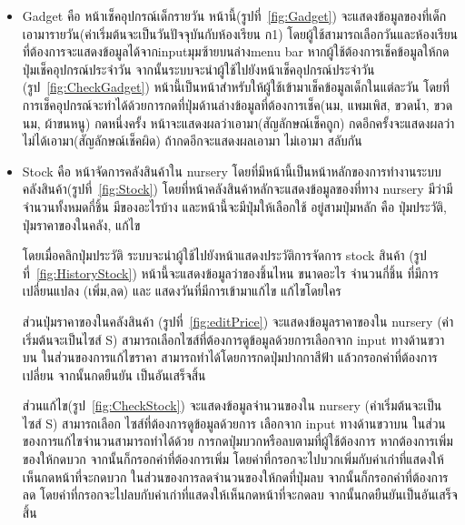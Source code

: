 \begin{itemize}
  \item  Gadget คือ หน้าเช็คอุปกรณ์เด็กรายวัน หน้านี้(รูปที่~\ref{fig:Gadget}) จะแสดงข้อมูลของที่เด็กเอามารายวัน(ค่าเริ่มต้นจะเป็นวันปัจจุบันกับห้องเรียน ก1) โดยผู้ใช้สามารถเลือกวันและห้องเรียนที่ต้องการจะแสดงข้อมูลได้จากinputมุมซ้ายบนล่างmenu bar 
  หากผู้ใช้ต้องการเช็คข้อมูลให้กดปุ่มเช็คอุปกรณ์ประจำวัน จากนั้นระบบจะนำผู้ใช้ไปยังหน้าเช็คอุปกรณ์ประจำวัน (รูป~\ref{fig:CheckGadget}) 
  หน้านี้เป็นหน้าสำหรับให้ผู้ใช้เข้ามาเช็คข้อมูลเด็กในแต่ละวัน โดยที่การเช็คอุปกรณ์จะทำได้ด้วยการกดที่ปุ่มด้านล่างข้อมูลที่ต้องการเช็ค(นม, แพมเพิส, ขวดน้ำ, ขวดนม, ผ้าขนหนู) กดหนึ่งครั้ง
  หน้าจะแสดงผลว่าเอามา(สัญลักษณ์เช็คถูก) กดอีกครั้งจะแสดงผลว่าไม่ได้เอามา(สัญลักษณ์เช็คผิด) ถ้ากดอีกจะแสดงผลเอามา ไม่เอามา สลับกัน
  
  \item  Stock คือ หน้าจัดการคลังสินค้าใน nursery โดยที่มีหน้านี้เป็นหน้าหลักของการทำงานระบบคลังสินค้า(รูปที่~\ref{fig:Stock}) โดยที่หน้าคลังสินค้าหลักจะแสดงข้อมูลของที่ทาง nursery มีว่ามีจำนวนทั้งหมดกี่ชิ้น มีของอะไรบ้าง และหน้านี้จะมีปุ่มให้เลือกใช้
  อยู่สามปุ่มหลัก คือ ปุ่มประวัติ, ปุ่มราคาของในคลัง, แก้ไข 
  
  โดยเมื่อคลิกปุ่มประวัติ ระบบจะนำผู้ใช้ไปยังหน้าแสดงประวัติการจัดการ stock สินค้า (รูปที่~\ref{fig:HistoryStock}) หน้านี้จะแสดงข้อมูลว่าของชิ้นไหน ขนาดอะไร จำนวนกี่ชิ้น ที่มีการเปลี่ยนแปลง (เพิ่ม,ลด) และ แสดงวันที่มีการเข้ามาแก้ไข แก้ไขโดยใคร
  
  ส่วนปุ่มราคาของในคลังสินค้า (รูปที่~\ref{fig:editPrice}) จะแสดงข้อมูลราคาของใน nursery (ค่าเริ่มต้นจะเป็นไซส์ S) สามารถเลือกไซส์ที่ต้องการดูข้อมูลด้วยการเลือกจาก input ทางด้านขวาบน ในส่วนของการแก้ไขราคา สามารถทำได้โดยการกดปุ่มปากกาสีฟ้า แล้วกรอกค่าที่ต้องการเปลี่ยน
  จากนั้นกดยืนยัน เป็นอันเสร็จสิ้น
  
  ส่วนแก้ไข(รูป~\ref{fig:CheckStock}) จะแสดงข้อมูลจำนวนของใน nursery (ค่าเริ่มต้นจะเป็นไซส์ S) สามารถเลือก
  ไซส์ที่ต้องการดูข้อมูลด้วยการ เลือกจาก input ทางด้านขวาบน ในส่วนของการแก้ไขจำนวนสามารถทำได้ด้วย การกดปุ่มบวกหรือลบตามที่ผู้ใช้ต้องการ 
  หากต้องการเพิ่มของให้กดบวก จากนั้นก็กรอกค่าที่ต้องการเพิ่ม โดยค่าที่กรอกจะไปบวกเพิ่มกับค่าเก่าที่แสดงให้เห็นกดหน้าที่จะกดบวก 
  ในส่วนของการลดจำนวนของให้กดที่ปุ่มลบ จากนั้นก็กรอกค่าที่ต้องการลด โดยค่าที่กรอกจะไปลบกับค่าเก่าที่แสดงให้เห็นกดหน้าที่จะกดลบ จากนั้นกดยืนยันเป็นอันเสร็จสิ้น
  

\end{itemize}
